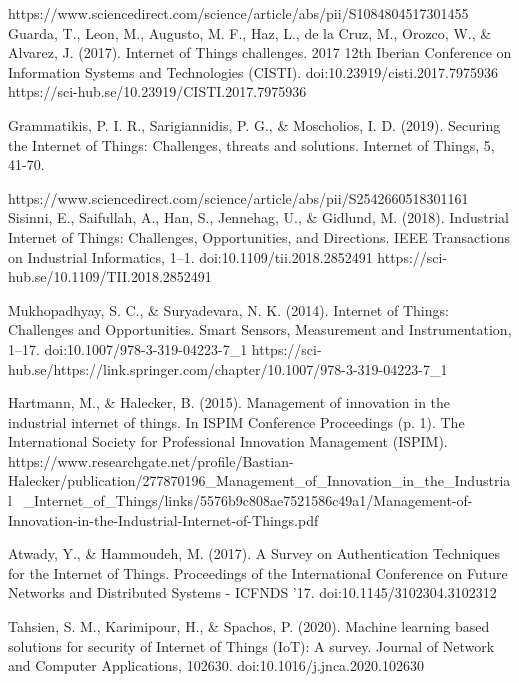 \documentclass[conference]{IEEEtran}
\begin{document}
\begin{thebibliography}{00}
https://www.sciencedirect.com/science/article/abs/pii/S1084804517301455
Guarda, T., Leon, M., Augusto, M. F., Haz, L., de la Cruz, M., Orozco, W., \& Alvarez, J. (2017). Internet of Things challenges. 2017 12th Iberian Conference on Information Systems and Technologies (CISTI). doi:10.23919/cisti.2017.7975936 https://sci-hub.se/10.23919/CISTI.2017.7975936

Grammatikis, P. I. R., Sarigiannidis, P. G., \& Moscholios, I. D. (2019). Securing the Internet of Things: Challenges, threats and solutions. Internet of Things, 5, 41-70. 

https://www.sciencedirect.com/science/article/abs/pii/S2542660518301161
Sisinni, E., Saifullah, A., Han, S., Jennehag, U., \& Gidlund, M. (2018). Industrial Internet of Things: Challenges, Opportunities, and Directions. IEEE Transactions on Industrial Informatics, 1–1. doi:10.1109/tii.2018.2852491 https://sci-hub.se/10.1109/TII.2018.2852491

 Mukhopadhyay, S. C., \& Suryadevara, N. K. (2014). Internet of Things: Challenges and Opportunities. Smart Sensors, Measurement and Instrumentation, 1–17. doi:10.1007/978-3-319-04223-7_1 https://sci-hub.se/https://link.springer.com/chapter/10.1007/978-3-319-04223-7\_1

 Hartmann, M., \& Halecker, B. (2015). Management of innovation in the industrial internet of things. In ISPIM Conference Proceedings (p. 1). The International Society for Professional Innovation Management (ISPIM). https://www.researchgate.net/profile/Bastian-Halecker/publication/277870196_Management_of_Innovation_in_the_Industrial \
_Internet_of_Things/links/5576b9c808ae7521586c49a1/Management-of-Innovation-in-the-Industrial-Internet-of-Things.pdf

 Atwady, Y., \& Hammoudeh, M. (2017). A Survey on Authentication Techniques for the Internet of Things. Proceedings of the International Conference on Future Networks and Distributed Systems  - ICFNDS  ’17. doi:10.1145/3102304.3102312 

 Tahsien, S. M., Karimipour, H., \& Spachos, P. (2020). Machine learning based solutions for security of Internet of Things (IoT): A survey. Journal of Network and Computer Applications, 102630. doi:10.1016/j.jnca.2020.102630 

\end{thebibliography}
\end{document}
